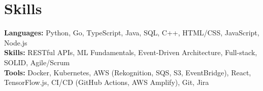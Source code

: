 \documentclass[11pt]{article}       %
\begin{document}

\vspace{-18.5pt}


\section*{Skills}
\textbf{Languages:} Python, Go, TypeScript, Java, SQL, C++, HTML/CSS, JavaScript, Node.js\\
\textbf{Skills:} RESTful APIs, ML Fundamentals, Event-Driven Architecture, Full-stack, SOLID, Agile/Scrum\\
\textbf{Tools:} Docker, Kubernetes, AWS (Rekognition, SQS, S3, EventBridge), React, TensorFlow.js, CI/CD (GitHub Actions, AWS Amplify), Git, Jira\\

\vspace{-6.5pt}
\end{document}
